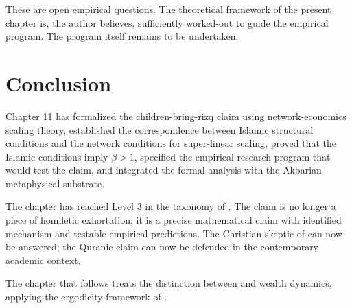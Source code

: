 These are open empirical questions. The theoretical framework of
the present chapter is, the author believes, sufficiently
worked-out to guide the empirical program. The program itself
remains to be undertaken.

\section{Conclusion}

Chapter 11 has formalized the children-bring-rizq claim using
network-economics scaling theory, established the correspondence
between Islamic structural conditions and the network conditions
for super-linear scaling, proved that the Islamic conditions
imply $\beta > 1$, specified the empirical research program that
would test the claim, and integrated the formal analysis with the
Akbarian metaphysical substrate.

The chapter has reached Level 3 in the taxonomy of
. The claim is no longer a piece of
homiletic exhortation; it is a precise mathematical claim with
identified mechanism and testable empirical predictions. The
Christian skeptic of  can now be answered;
the Quranic claim can now be defended in the contemporary academic
context.

The chapter that follows treats the distinction between
 and  wealth dynamics, applying the
ergodicity framework of .

